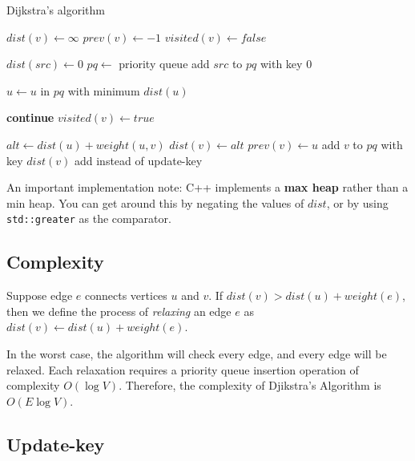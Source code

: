 \documentclass{article}
\begin{document}
\begin{algorithm}[H]
\caption{Dijkstra's algorithm}
\begin{algorithmic}

    \State $dist(v) \gets \infty$
    \State $prev(v) \gets -1$
    \State $visited(v) \gets false$
\EndFor

\State $dist(src) \gets 0$
\State $pq \gets$ priority queue
\State add $src$ to $pq$ with key $0$

    \State $u \gets u$ in $pq$ with minimum $dist(u)$
    
        \State \textbf{continue}
    \EndIf
    \State $visited(v) \gets true$

        \State $alt \gets dist(u) + weight(u, v)$
            \State $dist(v) \gets alt$
            \State $prev(v) \gets u$
            \State add $v$ to $pq$ with key $dist(v)$
            \Comment add instead of update-key
        \EndIf
    \EndFor
\EndWhile

\end{algorithmic}
\end{algorithm}

An important implementation note: C++ implements a \textbf{max heap} rather than a min heap. You can get around this by negating the values of $dist$, or by using \verb|std::greater| as the comparator.


\subsection{Complexity}

Suppose edge $e$ connects vertices $u$ and $v$. If $dist(v) > dist(u) + weight(e)$, then we define the process of \textit{relaxing} an edge $e$ as $dist(v) \gets dist(u) + weight(e)$.

In the worst case, the algorithm will check every edge, and every edge will be relaxed. Each relaxation requires a priority queue insertion operation of complexity $O(\log V)$. Therefore, the complexity of Djikstra's Algorithm is $O(E \log V)$.


\subsection{Update-key}
\end{document}
